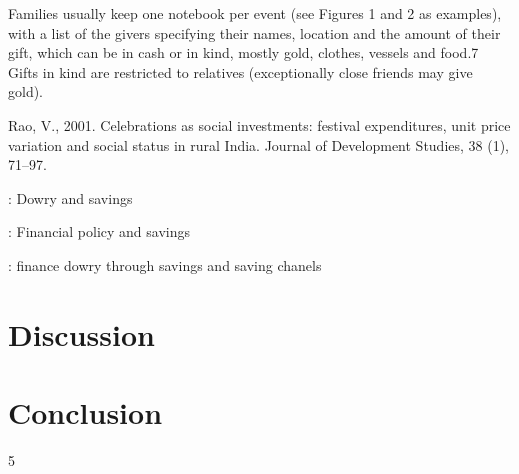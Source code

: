 \documentclass[a4paper, 11pt, onecolumn]{article}
\begin{document}
Families usually keep one notebook per event (see Figures 1 and 2 as examples), with a list of the
givers specifying their names, location and the amount of their gift, which can be in cash or in
kind, mostly gold, clothes, vessels and food.7 Gifts in kind are restricted to relatives (exceptionally
close friends may give gold).








Rao, V., 2001. Celebrations as social investments: festival expenditures, unit price variation and social status in rural
India. Journal of Development Studies, 38 (1), 71–97.




\cite{Heyer1992} : Dowry and savings

\cite{Goedecke2018} : Financial policy and savings

\cite{Anukriti2020} : finance dowry through savings and saving chanels







\section{Discussion}

\section*{Conclusion}
\label{section:conclusion}












\newpage




\clearpage
\newpage
\setcounter{tocdepth}5
\tableofcontents

\end{document}
